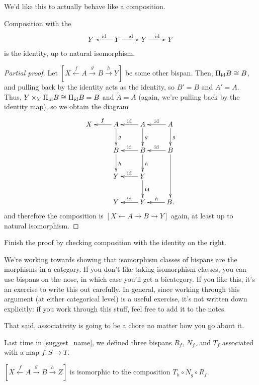 We'd like this to actually behave like a composition.
\begin{lem}
Composition with the 
\[\xymatrix{
	Y & Y\ar[l]_\id\ar[r]^\id & Y\ar[r]^\id & Y
}\]
is the identity, up to natural isomorphism.
\end{lem}
\begin{proof}[Partial proof]
Let $[X\stackrel f\gets A\stackrel g\to B\stackrel h\to Y]$ be some other bispan. Then, $\Pi_{\mathrm{id}} B\cong B$, and
pulling back by the identity acts as the identity, so $B' = B$ and $A' = A$. Thus, $Y\times_Y\Pi_{\mathrm{id}} B \cong
\Pi_{\mathrm{id}} B = B$ and $\widetilde A = A$ (again, we're pulling back by the identity map), so we obtain the diagram
\[\xymatrix{
	X & A\ar[l]_f\ar[d]^g & A\ar[l]_\id\ar[d]^g & A\ar[l]_\id\ar[d]^g\\
	& B\ar[d]^h & B\ar[l]_\id\ar[d]^h & B\ar[l]_\id\ar[dd]\\
	& Y & Y\ar[l]_\id\ar[d]^\id\\
	& Y & Y\ar[l]_\id & B.\ar[l]_h
}\]
and therefore the composition is $[X\gets A\to B\to Y]$ again, at least up to natural isomorphism.
\end{proof}
\begin{ex}
Finish the proof by checking composition with the identity on the right.
\end{ex}
\begin{rem}
We're working towards showing that isomorphism classes of bispans are the morphisms in a category. If you don't
like taking isomorphism classes, you can use bispans on the nose, in which case you'll get a bicategory. If you
like this, it's an exercise to write this out carefully. In general, since working through this argument (at either
categorical level) is a useful exercise, it's not written down explicitly: if you work through this stuff, feel
free to add it to the notes.

That said, associativity is going to be a chore no matter how you go about it.
\end{rem}
Last time in \cref{suggest_name}, we defined three bispans $R_f$, $N_f$, and $T_f$ associated with a map $f\colon
S\to T$.
\begin{lem}
\label{compasNTR}
$[X\stackrel f\gets A\stackrel g\to B\stackrel h\to Z]$ is isomorphic to the composition $T_h\circ N_g\circ R_f$.
\end{lem}
